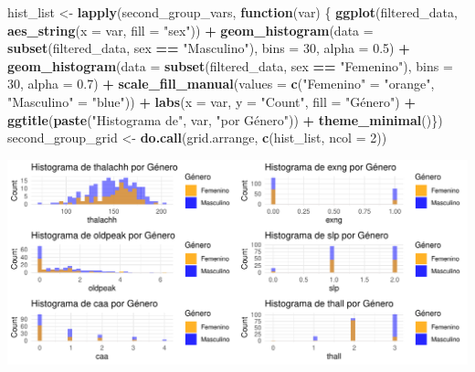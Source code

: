 \documentclass[
]{article}
\newenvironment{Shaded}{\begin{snugshade}}{\end{snugshade}}
\newcommand{\AttributeTok}[1]{\textcolor[rgb]{0.13,0.29,0.53}{#1}}
\newcommand{\ControlFlowTok}[1]{\textcolor[rgb]{0.13,0.29,0.53}{\textbf{#1}}}
\newcommand{\DecValTok}[1]{\textcolor[rgb]{0.00,0.00,0.81}{#1}}
\newcommand{\FloatTok}[1]{\textcolor[rgb]{0.00,0.00,0.81}{#1}}
\newcommand{\FunctionTok}[1]{\textcolor[rgb]{0.13,0.29,0.53}{\textbf{#1}}}
\newcommand{\NormalTok}[1]{#1}
\newcommand{\OtherTok}[1]{\textcolor[rgb]{0.56,0.35,0.01}{#1}}
\newcommand{\SpecialCharTok}[1]{\textcolor[rgb]{0.81,0.36,0.00}{\textbf{#1}}}
\newcommand{\StringTok}[1]{\textcolor[rgb]{0.31,0.60,0.02}{#1}}
\begin{document}
\begin{Shaded}
\begin{Highlighting}[]
\NormalTok{hist\_list }\OtherTok{\textless{}{-}} \FunctionTok{lapply}\NormalTok{(second\_group\_vars, }\ControlFlowTok{function}\NormalTok{(var) \{}
  \FunctionTok{ggplot}\NormalTok{(filtered\_data, }\FunctionTok{aes\_string}\NormalTok{(}\AttributeTok{x =}\NormalTok{ var, }\AttributeTok{fill =} \StringTok{"sex"}\NormalTok{)) }\SpecialCharTok{+}
    \FunctionTok{geom\_histogram}\NormalTok{(}\AttributeTok{data =} \FunctionTok{subset}\NormalTok{(filtered\_data, sex }\SpecialCharTok{==} \StringTok{"Masculino"}\NormalTok{), }\AttributeTok{bins =} \DecValTok{30}\NormalTok{, }\AttributeTok{alpha =} \FloatTok{0.5}\NormalTok{) }\SpecialCharTok{+}
    \FunctionTok{geom\_histogram}\NormalTok{(}\AttributeTok{data =} \FunctionTok{subset}\NormalTok{(filtered\_data, sex }\SpecialCharTok{==} \StringTok{"Femenino"}\NormalTok{), }\AttributeTok{bins =} \DecValTok{30}\NormalTok{, }\AttributeTok{alpha =} \FloatTok{0.7}\NormalTok{) }\SpecialCharTok{+}
    \FunctionTok{scale\_fill\_manual}\NormalTok{(}\AttributeTok{values =} \FunctionTok{c}\NormalTok{(}\StringTok{"Femenino"} \OtherTok{=} \StringTok{"orange"}\NormalTok{, }\StringTok{"Masculino"} \OtherTok{=} \StringTok{"blue"}\NormalTok{)) }\SpecialCharTok{+}
    \FunctionTok{labs}\NormalTok{(}\AttributeTok{x =}\NormalTok{ var, }\AttributeTok{y =} \StringTok{"Count"}\NormalTok{, }\AttributeTok{fill =} \StringTok{"Género"}\NormalTok{) }\SpecialCharTok{+} \FunctionTok{ggtitle}\NormalTok{(}\FunctionTok{paste}\NormalTok{(}\StringTok{"Histograma de"}\NormalTok{, var, }\StringTok{"por Género"}\NormalTok{)) }\SpecialCharTok{+}  \FunctionTok{theme\_minimal}\NormalTok{()\}) }
\NormalTok{second\_group\_grid }\OtherTok{\textless{}{-}} \FunctionTok{do.call}\NormalTok{(grid.arrange, }\FunctionTok{c}\NormalTok{(hist\_list, }\AttributeTok{ncol =} \DecValTok{2}\NormalTok{))}
\end{Highlighting}
\end{Shaded}

\includegraphics{coyolaf_ChristianOyola-PRA2_files/figure-latex/unnamed-chunk-19-1.pdf}
\end{document}
